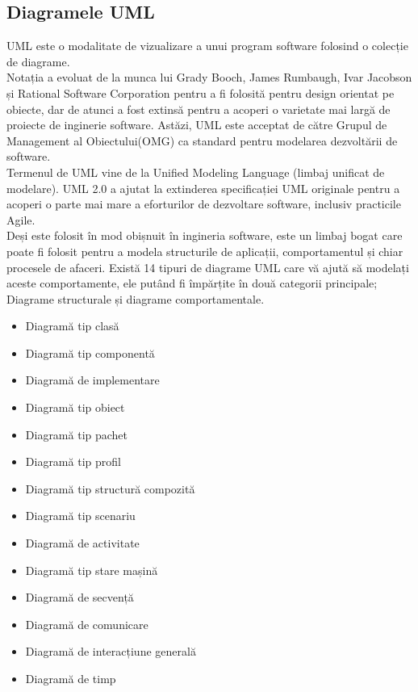 \subsection{Diagramele UML}
UML este o modalitate de vizualizare a unui program software folosind o colecție de diagrame.
\vspace{6pt}
\\Notația a evoluat de la munca lui Grady Booch, James Rumbaugh, Ivar Jacobson și Rational Software Corporation pentru a fi folosită pentru design orientat pe obiecte, dar de atunci a fost extinsă pentru a acoperi o varietate mai largă de proiecte de inginerie software. Astăzi, UML este acceptat de către Grupul de Management al Obiectului(OMG) ca standard pentru modelarea dezvoltării de software.
\vspace{6pt}
\\Termenul de UML vine de la Unified Modeling Language (limbaj unificat de modelare). UML 2.0 a ajutat la extinderea specificației UML originale pentru a acoperi o parte mai mare a eforturilor de dezvoltare software, inclusiv practicile Agile.
\vspace{6pt}
\\Deși este folosit în mod obișnuit în ingineria software, este un limbaj bogat care poate fi folosit pentru a modela structurile de aplicații, comportamentul și chiar procesele de afaceri. Există 14 tipuri de diagrame UML care vă ajută să modelați aceste comportamente, ele putând fi împărțite în două categorii principale; Diagrame structurale și diagrame comportamentale. 

	\begin{itemize}
	 \setlength\itemsep{0em}
		\item Diagramă tip clasă
		\item Diagramă tip componentă
		\item Diagramă de implementare
		\item Diagramă tip obiect	
		\item Diagramă tip pachet 
		\item Diagramă tip profil
		\item Diagramă tip structură compozită
		\item Diagramă tip scenariu
		\item Diagramă de activitate
		\item Diagramă tip stare mașină
		\item Diagramă de secvență
		\item Diagramă de comunicare
		\item Diagramă de interacțiune generală
		\item Diagramă de timp
	\end{itemize}


